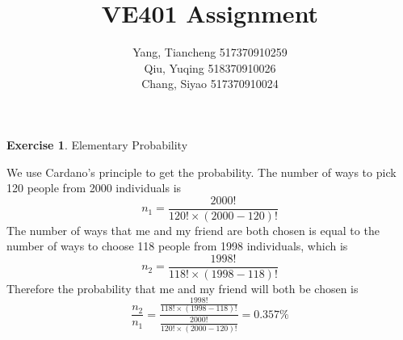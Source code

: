 \documentclass[12pt,a4paper]{article}
\makeatletter
\theoremstyle{definition}
\newtheorem{exercise}{Exercise}
\newtheorem*{solution}{Solution}
\renewenvironment{solution}[1][Solution] {\par\pushQED{\qed}\normalfont\topsep6\p@\@plus6\p@\relax\trivlist\item[\hskip\labelsep\bfseries#1\@addpunct{.}]\ignorespaces}{\popQED\endtrivlist\@endpefalse} \makeatother
\makeatother
\begin{document}
\title{VE401 Assignment}
\author{Yang, Tiancheng 517370910259\\Qiu, Yuqing 518370910026\\Chang, Siyao 517370910024}

\maketitle

\newpage

\begin{exercise}
Elementary Probability
\begin{solution}
We use Cardano's principle to get the probability. The number of ways to pick 120 people from 2000 individuals is
$$n_1=\frac{2000!}{120!\times(2000-120)!}$$
The number of ways that me and my friend are both chosen is equal to the number of ways to choose 118 people from 1998 individuals, which is
$$n_2=\frac{1998!}{118!\times(1998-118)!}$$
Therefore the probability that me and my friend will both be chosen is
$$\frac{n_2}{n_1}=\frac{\frac{1998!}{118!\times(1998-118)!}}{\frac{2000!}{120!\times(2000-120)!}}=0.357\%$$
\end{solution}
\end{exercise}
\end{document}
